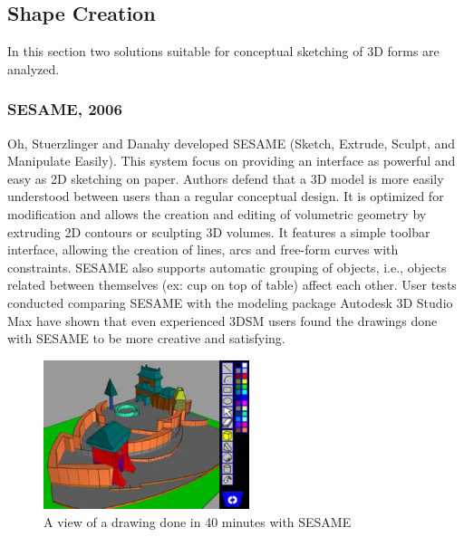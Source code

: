 \subsection{Shape Creation}


In this section two solutions suitable for conceptual sketching of 3D forms are analyzed.

\subsubsection{SESAME, 2006}

Oh, Stuerzlinger and Danahy \cite{SESAME3D} developed SESAME
(Sketch, Extrude, Sculpt, and Manipulate Easily).
This system focus on providing an interface as powerful and easy as 2D sketching on paper.
Authors defend that a 3D model is more easily understood between users than a regular conceptual design.
It is optimized for modification and allows the creation and editing of volumetric geometry
by extruding 2D contours or sculpting 3D volumes.
It features a simple toolbar interface, allowing the creation of lines,
arcs and free-form curves with constraints.
SESAME also supports automatic grouping of objects, i.e., objects related
between themselves (ex: cup on top of table) affect each other.
User tests conducted comparing SESAME with the modeling package
Autodesk 3D Studio Max have shown that even experienced 3DSM users found
the drawings done with SESAME to be more creative and satisfying.

\begin{figure}[!ht]
	\centering
	\includegraphics[width=6cm]{gfx/sesame.png}
	\caption{A view of a drawing done in 40 minutes with SESAME}
	\label{FIG-SESAME}
\end{figure}


